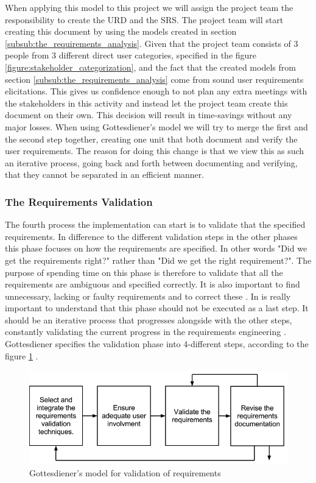 \documentclass[a4paper]{article}
\begin{document}
When applying this model to this project we will assign the project team the responsibility to create the URD and the SRS. The project team will start creating this document by using the models created in section \ref{subsub:the_requirements_analysis}.  Given that the project team consists of 3 people from 3 different direct user categories, specified in the figure \ref{figure:stakeholder_categorization}, and the fact that the created models from section \ref{subsub:the_requirements_analysis} come from sound user requirements elicitations. This gives us confidence enough to not plan any extra meetings with the stakeholders in this activity and instead let the project team create this document on their own. This decision will result in time-savings without any major losses. When using Gottesdiener's model we will try to merge the first and the second step together, creating one unit that both document and verify the user requirements. The reason for doing this change is that we view this as such an iterative process, going back and forth between documenting and verifying, that they cannot be separated in an efficient manner.  

\subsubsection{The Requirements Validation}
\label{subsub:the_requirements_validation}
The fourth process the implementation can start is to validate that the specified requirements. In difference to the different validation steps in the other phases this phase focuses on how the requirements are specified. In other words "Did we get the requirements right?" rather than "Did we get the right requirement?". The purpose of spending time on this phase is therefore to validate that all the requirements are ambiguous and specified correctly. It is also important to find unnecessary, lacking or faulty requirements and to correct these \cite{gott6}. In is really important to understand that this phase should not be executed as a last step. It  should be an iterative process that progresses alongside with the other steps, constantly validating the current progress in the requirements engineering \cite{gott6}. Gottesdiener specifies the validation phase into 4-different steps, according to the figure \ref{figure:validation} \cite{gott6}. 


\begin{figure}[H]
	\centering
		\includegraphics[width=1\textwidth]{images/validations_model.png}
	\caption{Gottesdiener's model for validation of requirements \cite{gott6}}
	\label{figure:validation}
\end{figure}
\end{document}
